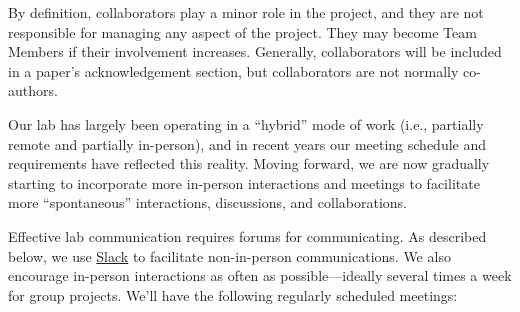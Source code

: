 \documentclass{tufte-book} %
\begin{document}
\begin{enumerate}
\begin{enumerate}
\end{enumerate}
By definition, collaborators play a minor role in the project, and they are not
responsible for managing any aspect of the project.  They may become Team
Members if their involvement increases.  Generally, collaborators will
be included in a paper's acknowledgement section, but collaborators
are not normally co-authors.
\end{enumerate}



\noindent Our lab has largely been operating in a ``hybrid'' mode of
work (i.e., partially remote and partially in-person), and in recent
years our meeting schedule and requirements have reflected this
reality.  Moving forward, we are now gradually starting to incorporate
more in-person interactions and meetings to facilitate more
``spontaneous'' interactions, discussions, and collaborations.

Effective lab communication requires forums for communicating.  As
described below, we use \href{http://www.slack.com}{Slack} to
facilitate non-in-person communications.  We also encourage
in-person interactions as often as possible---ideally several times a
week for group projects.  We'll have the following regularly scheduled
meetings:
\end{document}
